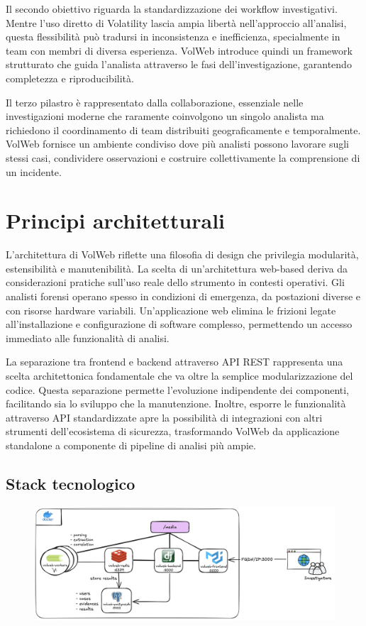 Il secondo obiettivo riguarda la standardizzazione dei workflow investigativi. Mentre l'uso diretto di Volatility lascia ampia libertà nell'approccio all'analisi, questa flessibilità può tradursi in inconsistenza e inefficienza, specialmente in team con membri di diversa esperienza. VolWeb introduce quindi un framework strutturato che guida l'analista attraverso le fasi dell'investigazione, garantendo completezza e riproducibilità. 

Il terzo pilastro è rappresentato dalla collaborazione, essenziale nelle investigazioni moderne che raramente coinvolgono un singolo analista ma richiedono il coordinamento di team distribuiti geograficamente e temporalmente. VolWeb fornisce un ambiente condiviso dove più analisti possono lavorare sugli stessi casi, condividere osservazioni e costruire collettivamente la comprensione di un incidente.


\section{Principi architetturali}

L'architettura di VolWeb riflette una filosofia di design che privilegia modularità, estensibilità e manutenibilità. La scelta di un'architettura web-based deriva da considerazioni pratiche sull'uso reale dello strumento in contesti operativi. Gli analisti forensi operano spesso in condizioni di emergenza, da postazioni diverse e con risorse hardware variabili. Un'applicazione web elimina le frizioni legate all'installazione e configurazione di software complesso, permettendo un accesso immediato alle funzionalità di analisi.

La separazione tra frontend e backend attraverso API REST \cite{restapi} rappresenta una scelta architettonica fondamentale che va oltre la semplice modularizzazione del codice. Questa separazione permette l'evoluzione indipendente dei componenti, facilitando sia lo sviluppo che la manutenzione. Inoltre, esporre le funzionalità attraverso API standardizzate apre la possibilità di integrazioni con altri strumenti dell'ecosistema di sicurezza, trasformando VolWeb da applicazione standalone a componente di pipeline di analisi più ampie.

\subsection{Stack tecnologico}

\begin{figure}[H]
    \centering
    \includegraphics[width=1\linewidth]{images/volweb-original/volweb-arch.png}
\end{figure}

